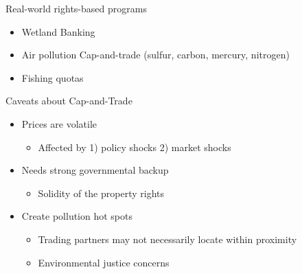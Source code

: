 \begin{frame}{Real-world rights-based programs}
\protect\hypertarget{real-world-rights-based-programs}{}

\begin{itemize}
\tightlist
\item
  Wetland Banking
\item
  Air pollution Cap-and-trade (sulfur, carbon, mercury, nitrogen)
\item
  Fishing quotas
\end{itemize}

\end{frame}

\begin{frame}{Caveats about Cap-and-Trade}
\protect\hypertarget{caveats-about-cap-and-trade}{}

\begin{itemize}
\tightlist
\item
  Prices are volatile

  \begin{itemize}
  \tightlist
  \item
    Affected by 1) policy shocks 2) market shocks
  \end{itemize}
\item
  Needs strong governmental backup

  \begin{itemize}
  \tightlist
  \item
    Solidity of the property rights
  \end{itemize}
\item
  Create pollution hot spots

  \begin{itemize}
  \tightlist
  \item
    Trading partners may not necessarily locate within proximity
  \item
    Environmental justice concerns
  \end{itemize}
\end{itemize}

\end{frame}


